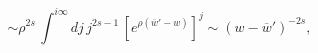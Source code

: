 \begin{equation*}
\sim \rho^{2s}\,\int^{i\infty}dj\,j^{2s-1}\,
\left[e^{\rho(\overline{w}'-w)}\right]^j\sim (w-\overline{w}')^{-2s},
\end{equation*}

